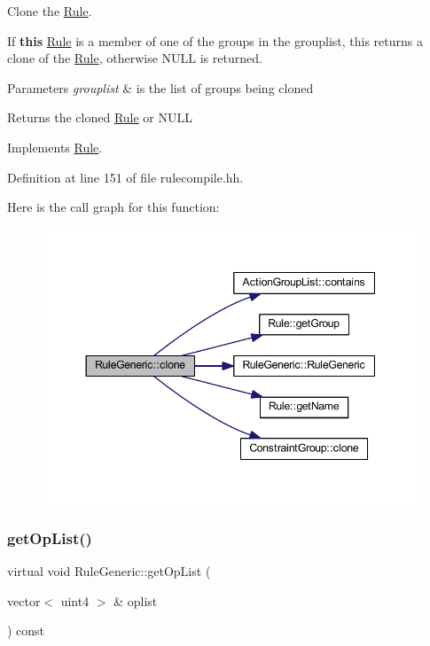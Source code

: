 Clone the \mbox{\hyperlink{class_rule}{Rule}}. 

If {\bfseries{this}} \mbox{\hyperlink{class_rule}{Rule}} is a member of one of the groups in the grouplist, this returns a clone of the \mbox{\hyperlink{class_rule}{Rule}}, otherwise N\+U\+LL is returned. 
\begin{DoxyParams}{Parameters}
{\em grouplist} & is the list of groups being cloned \\
\hline
\end{DoxyParams}
\begin{DoxyReturn}{Returns}
the cloned \mbox{\hyperlink{class_rule}{Rule}} or N\+U\+LL 
\end{DoxyReturn}


Implements \mbox{\hyperlink{class_rule_a70de90a76461bfa7ea0b575ce3c11e4d}{Rule}}.



Definition at line 151 of file rulecompile.\+hh.

Here is the call graph for this function\+:
\nopagebreak
\begin{figure}[H]
\begin{center}
\leavevmode
\includegraphics[width=344pt]{class_rule_generic_a98b2f92f8bcfebd473dd4e27fd183815_cgraph}
\end{center}
\end{figure}
\mbox{\label{class_rule_generic_a76ff5779a40a75ebdd0d2b213a35f1ec}} 
\subsubsection{\texorpdfstring{getOpList()}{getOpList()}}
{\footnotesize\ttfamily virtual void Rule\+Generic\+::get\+Op\+List (\begin{DoxyParamCaption}\item[{vector$<$ uint4 $>$ \&}]{oplist }\end{DoxyParamCaption}) const\hspace{0.3cm}{\ttfamily [virtual]}}



